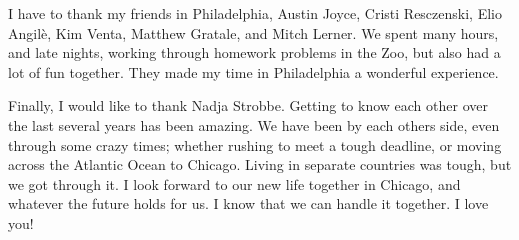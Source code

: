 I have to thank my friends in Philadelphia,
Austin Joyce,
Cristi Resczenski,
Elio Angil\`{e},
Kim Venta,
Matthew Gratale,
and Mitch Lerner.
We spent many hours, and late nights, working through homework problems in the
Zoo, but also had a lot of fun together.
They made my time in Philadelphia a wonderful experience.

Finally, I would like to thank Nadja Strobbe.
Getting to know each other over the last several years has been amazing.
We have been by each others side, even through some crazy times; whether
rushing to meet a tough deadline, or moving across the Atlantic Ocean to
Chicago.
Living in separate countries was tough, but we got through it.
I look forward to our new life together in Chicago, and whatever the future
holds for us.
I know that we can handle it together.
I love you!

